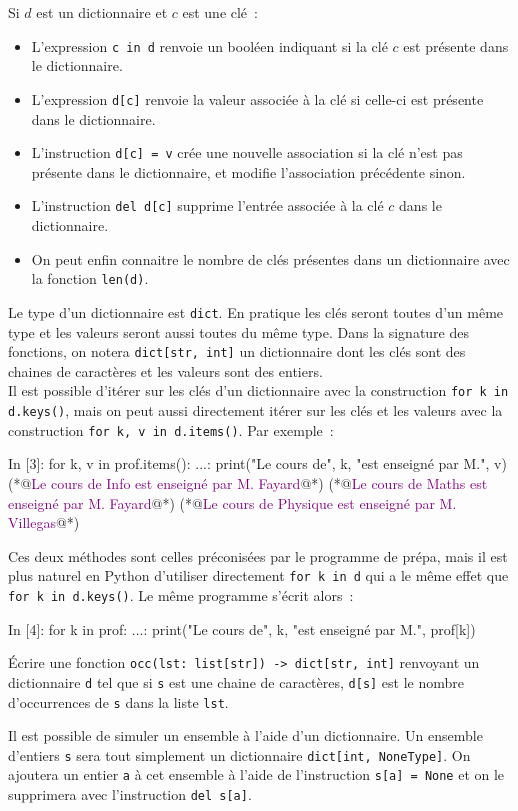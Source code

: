 \documentclass{magnoliaold}
\begin{document}
Si $d$ est un dictionnaire et $c$ est une clé~:
\begin{itemize}
\item L'expression \verb!c in d! renvoie un booléen indiquant si la clé $c$ est présente dans le dictionnaire.
\item L'expression \verb!d[c]! renvoie la valeur associée à la clé si celle-ci est présente dans le dictionnaire.
\item L'instruction \verb!d[c] = v! crée une nouvelle association si la clé n'est pas présente dans le
  dictionnaire, et modifie l'association précédente sinon.
\item L'instruction \verb!del d[c]! supprime l'entrée associée à la clé $c$ dans le dictionnaire.
\item On peut enfin connaitre le nombre de clés présentes dans un
  dictionnaire avec la fonction \verb!len(d)!.
\end{itemize}

Le type d'un dictionnaire est \verb!dict!. En pratique les clés seront toutes d'un même type et les valeurs
seront aussi toutes du même type. Dans la signature des fonctions, on notera \verb!dict[str, int]! un dictionnaire
dont les clés sont des chaines de caractères et les valeurs sont des entiers.\\

Il est possible d'itérer sur les clés d'un dictionnaire avec la construction
\verb!for k in d.keys()!, mais on peut aussi directement itérer sur les clés et les
valeurs avec la construction \verb!for k, v in d.items()!. Par exemple~:
\begin{pythoncode}
In [3]: for k, v in prof.items():
   ...:     print("Le cours de", k, "est enseigné par M.",  v)
(*@\textcolor{purple}{Le cours de Info est enseigné par M. Fayard}@*)
(*@\textcolor{purple}{Le cours de Maths est enseigné par M. Fayard}@*)
(*@\textcolor{purple}{Le cours de Physique est enseigné par M. Villegas}@*)
\end{pythoncode}
Ces deux méthodes sont celles préconisées par le programme de prépa, mais il est plus naturel
en Python d'utiliser directement \verb!for k in d! qui a le même effet que
\verb!for k in d.keys()!. Le même programme s'écrit alors~:
\begin{pythoncode}
In [4]: for k in prof:
   ...:     print("Le cours de", k, "est enseigné par M.",  prof[k])
\end{pythoncode}
\vspace{2ex}
\begin{exoUnique}
\exo Écrire une fonction \verb!occ(lst: list[str]) -> dict[str, int]! renvoyant un dictionnaire \verb!d! tel
  que si \verb!s! est une chaine de caractères, \verb!d[s]! est le nombre d'occurrences de \verb!s! dans la liste
  \verb!lst!.
\end{exoUnique}
\vspace{2ex}
Il est possible de simuler un ensemble à l'aide d'un dictionnaire. Un ensemble d'entiers \verb!s! sera tout
simplement un dictionnaire \verb!dict[int, NoneType]!. On ajoutera un entier \verb!a! à cet ensemble
à l'aide de l'instruction \verb!s[a] = None! et on le supprimera avec l'instruction
\verb!del s[a]!.



\end{document}
